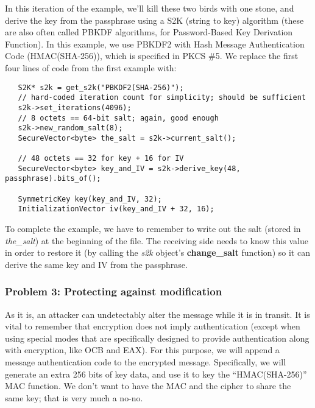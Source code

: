 \documentclass{article}
\newcommand{\function}[1]{\textbf{#1}}
\newcommand{\variable}[1]{\textsl{#1}}
\begin{document}
In this iteration of the example, we'll kill these two birds with one
stone, and derive the key from the passphrase using a S2K (string to
key) algorithm (these are also often called PBKDF algorithms, for
Password-Based Key Derivation Function). In this example, we use
PBKDF2 with Hash Message Authentication Code (HMAC(SHA-256)), which is
specified in PKCS \#5. We replace the first four lines of code from
the first example with:

\begin{verbatim}
   S2K* s2k = get_s2k("PBKDF2(SHA-256)");
   // hard-coded iteration count for simplicity; should be sufficient
   s2k->set_iterations(4096);
   // 8 octets == 64-bit salt; again, good enough
   s2k->new_random_salt(8);
   SecureVector<byte> the_salt = s2k->current_salt();

   // 48 octets == 32 for key + 16 for IV
   SecureVector<byte> key_and_IV = s2k->derive_key(48, passphrase).bits_of();

   SymmetricKey key(key_and_IV, 32);
   InitializationVector iv(key_and_IV + 32, 16);
\end{verbatim}

To complete the example, we have to remember to write out the salt (stored in
\variable{the\_salt}) at the beginning of the file. The receiving side needs to
know this value in order to restore it (by calling the \variable{s2k} object's
\function{change\_salt} function) so it can derive the same key and IV from the
passphrase.

\subsubsection{Problem 3: Protecting against modification}

As it is, an attacker can undetectably alter the message while it is
in transit. It is vital to remember that encryption does not imply
authentication (except when using special modes that are specifically
designed to provide authentication along with encryption, like OCB and
EAX). For this purpose, we will append a message authentication code
to the encrypted message. Specifically, we will generate an extra 256
bits of key data, and use it to key the ``HMAC(SHA-256)'' MAC
function. We don't want to have the MAC and the cipher to share the
same key; that is very much a no-no.
\end{document}
